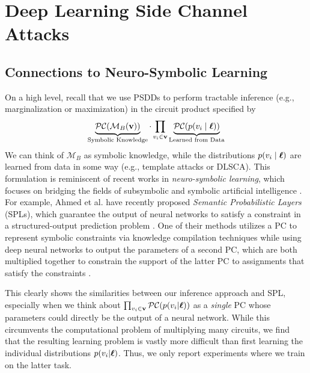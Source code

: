 \chapter{Deep Learning Side Channel Attacks}
\label{cha:dlsca}

\section{Connections to Neuro-Symbolic Learning}
\label{sec:neuro_symb}

On a high level, recall that we use PSDDs to perform tractable inference (e.g., marginalization or maximization) in the circuit product specified by
\begin{align}
    \underbrace{\mathcal{PC}(\mathcal{M}_B(\mathbf{v}))}_{\text{Symbolic Knowledge}} \cdot \prod_{v_i \in \mathbf{v}} \underbrace{\mathcal{PC}(p(v_i \mid \boldsymbol{\ell}))}_{\text{Learned from Data}}
\end{align}
We can think of $\mathcal{M}_B$ as symbolic knowledge, while the distributions $p(v_i \mid \boldsymbol{\ell})$ are learned from data in some way (e.g., template attacks or DLSCA). This formulation is reminiscent of recent works in \emph{neuro-symbolic learning}, which focuses on bridging the fields of subsymbolic and symbolic artificial intelligence \cite{spl}. For example, Ahmed et al. have recently proposed \emph{Semantic Probabilistic Layers} (SPLs), which guarantee the output of neural networks to satisfy a constraint in a structured-output prediction problem \cite{spl}. One of their methods utilizes a PC to represent symbolic constraints via knowledge compilation techniques while using deep neural networks to output the parameters of a second PC, which are both multiplied together to constrain the support of the latter PC to assignments that satisfy the constraints \cite{spl}.

This clearly shows the similarities between our inference approach and SPL, especially when we think about $\prod_{v_i \in \mathbf{v}} \mathcal{PC}(p(v_i | \boldsymbol{\ell}))$ as a \emph{single} PC whose parameters could directly be the output of a neural network. While this circumvents the computational problem of multiplying many circuits, we find that the resulting learning problem is vastly more difficult than first learning the individual distributions $p(v_i | \boldsymbol{\ell})$. Thus, we only report experiments where we train on the latter task.

